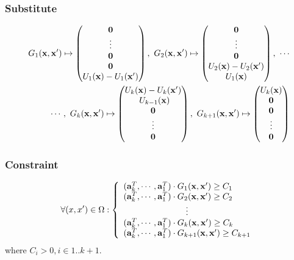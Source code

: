 \begin{frame}
\frametitle{Substitute}
\begin{equation}
	\begin{split}
		G_{1}(\varsvec, \varsvec') \mapsto 
			\begin{pmatrix}
			\vectzero\\
			\vdots\\
			\vectzero \\
			\vectzero \\
			U_{1}(\varsvec) - U_{1}(\varsvec')
			\end{pmatrix},\ 
		G_{2}(\varsvec, \varsvec') \mapsto 
			\begin{pmatrix}
			\vectzero\\
			\vdots\\
			\vectzero\\
			U_{2}(\varsvec) - U_{2}(\varsvec')\\
			U_{1}(\varsvec)
			\end{pmatrix},\ \cdots
		\\
		\cdots,\ 
		G_{k}(\varsvec, \varsvec') \mapsto
			\begin{pmatrix}
			U_{k}(\varsvec)-U_{k}(\varsvec')\\
			\ U_{k-1}(\varsvec)\\
			\vectzero\\
			\vdots\\
			\vectzero
			\end{pmatrix},\ 
		G_{k+1}(\varsvec, \varsvec') \mapsto
			\begin{pmatrix}
			U_{k}(\varsvec)\\
			\vectzero \\
			\vectzero \\
			\vdots\\
			\vectzero
			\end{pmatrix}
	\end{split} \notag
	\label{eq:notation}
\end{equation}
\end{frame}

\begin{frame}
\frametitle{Constraint}
\begin{equation}\label{eq:nestedrf:form2}
\forall (x, x') \in \Omega :
\left\{
	\begin{array}{ll}
		(\vect{a}^{T}_{k}, \cdots, \vect{a}^{T}_{1}) \cdot G_{1}(\varsvec, \varsvec') \geq C_{1} \\
		(\vect{a}^{T}_{k}, \cdots, \vect{a}^{T}_{1}) \cdot G_{2}(\varsvec, \varsvec') \geq C_{2} \\
		\multicolumn{1}{c}{\vdots} \\
        (\vect{a}^{T}_{k}, \cdots, \vect{a}^{T}_{1}) \cdot G_{k}(\varsvec, \varsvec')  \geq C_{k} \\
		(\vect{a}^{T}_{k}, \cdots, \vect{a}^{T}_{1}) \cdot G_{k+1}(\varsvec, \varsvec')  \geq C_{k+1}
	\end{array}
\right.
\end{equation}
where $C_i>0, i\in 1..k+1$.
\end{frame}

